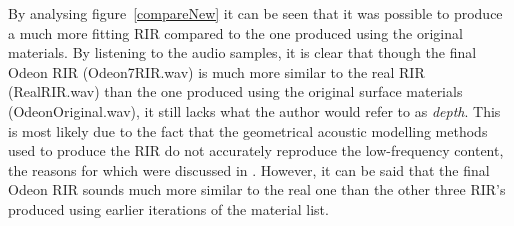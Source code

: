 \documentclass[../../main.tex]{subfiles}
\begin{document}


			By analysing figure~\ref{compareNew} it can be seen that it was possible to produce a much more fitting \ac{RIR} compared to the one produced using the original materials. By listening to the audio samples, it is clear that though the final Odeon RIR (Odeon7RIR.wav) is much more similar to the real \ac{RIR} (RealRIR.wav) than the one produced using the original surface materials (OdeonOriginal.wav), it still lacks what the author would refer to as \textit{depth}. This is most likely due to the fact that the geometrical acoustic modelling methods used to produce the \ac{RIR} do not accurately reproduce the low-frequency content, the reasons for which were discussed in . However, it can be said that the final Odeon \ac{RIR} sounds much more similar to the real one than the other three \ac{RIR}'s produced using earlier iterations of the material list.
\end{document}
